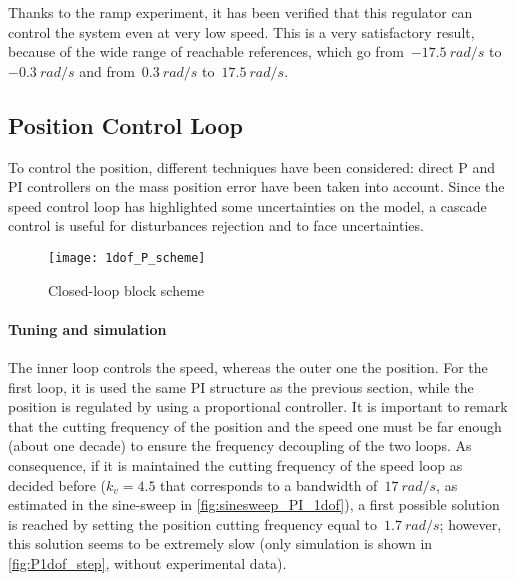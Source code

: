 Thanks to the ramp experiment, it has been verified that this regulator can control the system even at very low speed. This is a very satisfactory result, because of the wide range of reachable references, which go from~$-17.5\ rad/s$ to~$-0.3\ rad/s$ and from~$0.3\ rad/s$ to~$17.5\ rad/s$.

\subsection{Position Control Loop}
To control the position, different techniques have been considered: direct P and PI controllers on the mass position error have been taken into account. Since the speed control loop has highlighted some uncertainties on the model, a cascade control is useful for disturbances rejection and to face uncertainties.
\begin{figure*}[h]
	\centering
	\texttt{[image: 1dof\_P\_scheme]}
	\caption{Closed-loop block scheme}
\end{figure*}

\paragraph{Tuning and simulation}
The inner loop controls the speed, whereas the outer one the position. For the first loop, it is used the same PI structure as the previous section, while the position is regulated by using a proportional controller. It is important to remark that the cutting frequency of the position and the speed one must be far enough (about one decade) to ensure the frequency decoupling of the two loops. As consequence, if it is maintained the cutting frequency of the speed loop as decided before ($k_v=4.5$ that corresponds to a bandwidth of~$17\ rad/s$, as estimated in the sine-sweep in \cref{fig:sinesweep_PI_1dof}), a first possible solution is reached by setting the position cutting frequency equal to~$1.7\ rad/s$; however, this solution seems to be extremely slow (only simulation is shown in \cref{fig:P1dof_step}, without experimental data). \\

